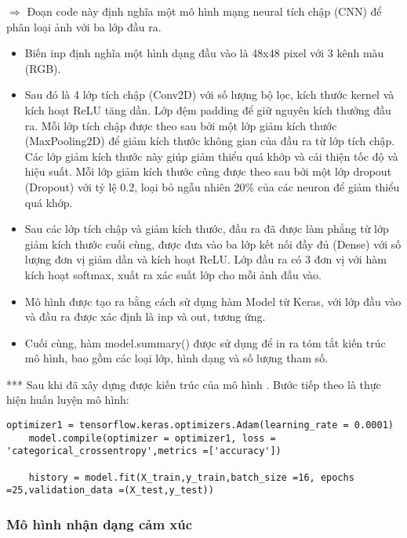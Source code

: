 $\Longrightarrow$ Đoạn code này định nghĩa một mô hình mạng neural tích chập (CNN) để phân loại ảnh với ba lớp đầu ra. 

\begin{itemize}
	\item Biến inp định nghĩa một hình dạng đầu vào là 48x48 pixel với 3 kênh màu (RGB).
	
	\item Sau đó là 4 lớp tích chập (Conv2D) với số lượng bộ lọc, kích thước kernel và kích hoạt ReLU tăng dần. Lớp đệm padding để giữ nguyên kích thưởng đầu ra. Mỗi lớp tích chập được theo sau bởi một lớp giảm kích thước (MaxPooling2D) để giảm kích thước không gian của đầu ra từ lớp tích chập. Các lớp giảm kích thước này giúp giảm thiểu quá khớp và cải thiện tốc độ và hiệu suất. Mỗi lớp giảm kích thước cũng được theo sau bởi một lớp dropout (Dropout) với tỷ lệ 0.2, loại bỏ ngẫu nhiên 20\% của các neuron để giảm thiểu quá khớp.
	
	\item Sau các lớp tích chập và giảm kích thước, đầu ra đã được làm phẳng từ lớp giảm kích thước cuối cùng, được đưa vào ba lớp kết nối đầy đủ (Dense) với số lượng đơn vị giảm dần và kích hoạt ReLU. Lớp đầu ra có 3 đơn vị với hàm kích hoạt softmax, xuất ra xác suất lớp cho mỗi ảnh đầu vào.
	
	\item Mô hình được tạo ra bằng cách sử dụng hàm Model từ Keras, với lớp đầu vào và đầu ra được xác định là inp và out, tương ứng.
	
	\item Cuối cùng, hàm model.summary() được sử dụng để in ra tóm tắt kiến trúc mô hình, bao gồm các loại lớp, hình dạng và số lượng tham số.
\end{itemize}

*** Sau khi đã xây dựng được kiến trúc của mô hình . Bước tiếp theo là thực hiện huấn luyện mô hình: 

\begin{lstlisting}[style=codePython]
	optimizer1 = tensorflow.keras.optimizers.Adam(learning_rate = 0.0001)
	model.compile(optimizer = optimizer1, loss = 'categorical_crossentropy',metrics =['accuracy'])
	
	history = model.fit(X_train,y_train,batch_size =16, epochs =25,validation_data =(X_test,y_test))				
\end{lstlisting}

\subsubsection{Mô hình nhận dạng cảm xúc}

